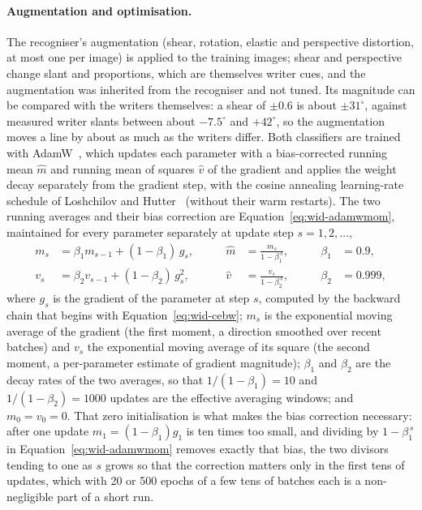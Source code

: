 \paragraph{Augmentation and optimisation.}
The recogniser's augmentation (shear, rotation, elastic and perspective distortion, at most one per image) is applied to the training images; shear and perspective change slant and proportions, which are themselves writer cues, and the augmentation was inherited from the recogniser and not tuned.
Its magnitude can be compared with the writers themselves: a shear of $\pm0.6$ is about $\pm31^\circ$, against measured writer slants between about $-7.5^\circ$ and $+42^\circ$, so the augmentation moves a line by about as much as the writers differ.
Both classifiers are trained with AdamW~\cite{kingma2015,loshchilov2019}, which updates each parameter with a bias-corrected running mean $\hat m$ and running mean of squares $\hat v$ of the gradient and applies the weight decay separately from the gradient step, with the cosine annealing learning-rate schedule of Loshchilov and Hutter~\cite{loshchilov2017} (without their warm restarts).
The two running averages and their bias correction are Equation~\ref{eq:wid-adamwmom}, maintained for every parameter separately at update step $s=1,2,\ldots$,
\begin{equation}
\begin{aligned}
m_s&=\beta_1m_{s-1}+(1-\beta_1)\,g_s, &\qquad \hat m&=\frac{m_s}{1-\beta_1^{\,s}}, &\qquad \beta_1&=0.9,\\
v_s&=\beta_2v_{s-1}+(1-\beta_2)\,g_s^2, &\qquad \hat v&=\frac{v_s}{1-\beta_2^{\,s}}, &\qquad \beta_2&=0.999,
\end{aligned}
\label{eq:wid-adamwmom}
\end{equation}
where $g_s$ is the gradient of the parameter at step $s$, computed by the backward chain that begins with Equation~\ref{eq:wid-cebw}; $m_s$ is the exponential moving average of the gradient (the first moment, a direction smoothed over recent batches) and $v_s$ the exponential moving average of its square (the second moment, a per-parameter estimate of gradient magnitude); $\beta_1$ and $\beta_2$ are the decay rates of the two averages, so that $1/(1-\beta_1)=10$ and $1/(1-\beta_2)=1000$ updates are the effective averaging windows; and $m_0=v_0=0$.
That zero initialisation is what makes the bias correction necessary: after one update $m_1=(1-\beta_1)g_1$ is ten times too small, and dividing by $1-\beta_1^{\,s}$ in Equation~\ref{eq:wid-adamwmom} removes exactly that bias, the two divisors tending to one as $s$ grows so that the correction matters only in the first tens of updates, which with 20 or 500 epochs of a few tens of batches each is a non-negligible part of a short run.
